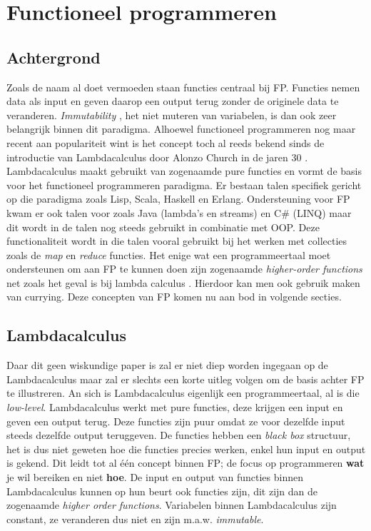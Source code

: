\section{Functioneel programmeren}
\subsection{Achtergrond}
Zoals de naam al doet vermoeden staan functies centraal bij FP. Functies nemen data als input en geven daarop een output terug zonder de originele data te veranderen. \textit{Immutability} \autocite{Goetz2006}, het niet muteren van variabelen, is dan ook zeer belangrijk binnen dit paradigma. Alhoewel functioneel programmeren nog maar recent aan populariteit wint is het concept toch al reeds bekend sinds de introductie van Lambdacalculus door Alonzo Church in de jaren 30 \autocite{Church1941}. Lambdacalculus maakt gebruikt van zogenaamde pure functies en vormt de basis voor het functioneel programmeren paradigma. Er bestaan talen specifiek gericht op die paradigma zoals Lisp, Scala, Haskell en Erlang. Ondersteuning voor FP kwam er ook talen voor zoals Java (lambda's en streams) en C\# (LINQ) maar dit wordt in de talen nog steeds gebruikt in combinatie met OOP. Deze functionaliteit wordt in die talen vooral gebruikt bij het werken met collecties zoals de \textit{map} en \textit{reduce} functies. Het enige wat een programmeertaal moet ondersteunen om aan FP te kunnen doen zijn zogenaamde \textit{higher-order functions} net zoals het geval is bij lambda calculus \autocite{Federale2019}. Hierdoor kan men ook gebruik maken van currying. Deze concepten van FP komen nu aan bod in volgende secties.

\subsection{Lambdacalculus}
Daar dit geen wiskundige paper is zal er niet diep worden ingegaan op de Lambdacalculus maar zal er slechts een korte uitleg volgen om de basis achter FP te illustreren. An sich is Lambdacalculus eigenlijk een programmeertaal, al is die \textit{low-level}. Lambdacalculus werkt met pure functies, deze krijgen een input en geven een output terug. Deze functies zijn puur omdat ze voor dezelfde input steeds dezelfde output teruggeven. De functies hebben een \textit{black box} structuur, het is dus niet geweten hoe die functies precies werken, enkel hun input en output is gekend. Dit leidt tot al één concept binnen FP; de focus op programmeren \textbf{wat} je wil bereiken en niet \textbf{hoe}. De input en output van functies binnen Lambdacalculus kunnen op hun beurt ook functies zijn, dit zijn dan de zogenaamde \textit{higher order functions}. Variabelen binnen Lambdacalculus zijn constant, ze veranderen dus niet en zijn m.a.w. \textit{immutable}.

